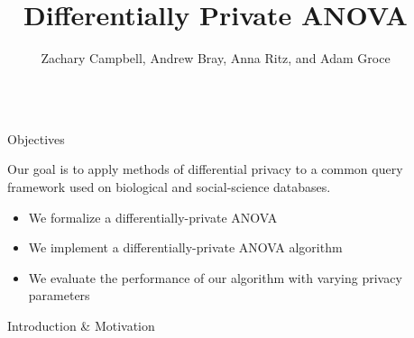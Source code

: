 \documentclass[final]{beamer}
\title{Differentially Private ANOVA} %
\author{Zachary Campbell, Andrew Bray, Anna Ritz, and Adam Groce} %
\institute{Reed College} %
\newlength{\sepwid}
\newlength{\onecolwid}
\begin{document}

\setlength{\belowcaptionskip}{2ex} %
\setlength\belowdisplayshortskip{2ex} %

\begin{frame}[t] %

\begin{columns}[t] %

\begin{column}{\sepwid}\end{column} %

\begin{column}{\onecolwid} %


\begin{alertblock}{Objectives}

Our goal is to apply methods of differential privacy to a common query framework used on biological and social-science databases. 

\begin{itemize}
\item We formalize a differentially-private ANOVA %
\item We implement a differentially-private ANOVA algorithm 
\item We evaluate the performance of our algorithm with varying privacy parameters 
\end{itemize}

\end{alertblock}


\begin{block}{Introduction \& Motivation}



\end{block}
\end{column}
\end{columns}
\end{frame}
\end{document}
